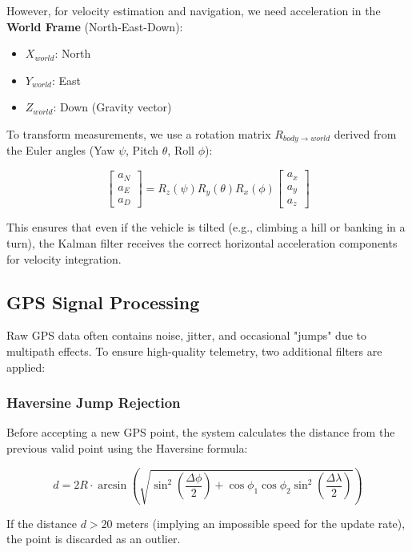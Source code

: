 \documentclass[11pt,a4paper]{article}
\begin{document}
However, for velocity estimation and navigation, we need acceleration in the \textbf{World Frame} (North-East-Down):
\begin{itemize}
    \item $X_{world}$: North
    \item $Y_{world}$: East
    \item $Z_{world}$: Down (Gravity vector)
\end{itemize}

To transform measurements, we use a rotation matrix $R_{body \to world}$ derived from the Euler angles (Yaw $\psi$, Pitch $\theta$, Roll $\phi$):

\begin{equation}
\begin{bmatrix} a_N \\ a_E \\ a_D \end{bmatrix} = R_z(\psi) R_y(\theta) R_x(\phi) \begin{bmatrix} a_x \\ a_y \\ a_z \end{bmatrix}
\end{equation}

This ensures that even if the vehicle is tilted (e.g., climbing a hill or banking in a turn), the Kalman filter receives the correct horizontal acceleration components for velocity integration.

\subsection{GPS Signal Processing}
Raw GPS data often contains noise, jitter, and occasional "jumps" due to multipath effects. To ensure high-quality telemetry, two additional filters are applied:

\subsubsection{Haversine Jump Rejection}
Before accepting a new GPS point, the system calculates the distance from the previous valid point using the Haversine formula:

\begin{equation}
d = 2R \cdot \arcsin\left(\sqrt{\sin^2\left(\frac{\Delta\phi}{2}\right) + \cos \phi_1 \cos \phi_2 \sin^2\left(\frac{\Delta\lambda}{2}\right)}\right)
\end{equation}

If the distance $d > 20$ meters (implying an impossible speed for the update rate), the point is discarded as an outlier.
\end{document}
